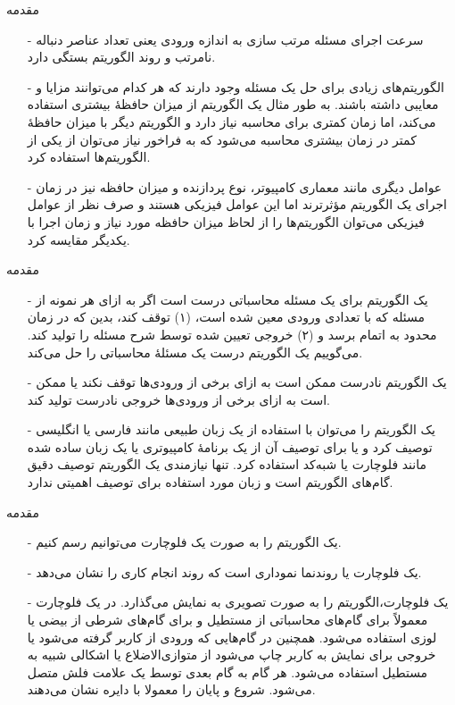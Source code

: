 \begin{frame}{مقدمه}
\begin{itemize}\itemr
\item[-]
سرعت اجرای مسئله مرتب سازی به اندازه ورودی یعنی تعداد عناصر دنباله نامرتب و روند الگوریتم بستگی دارد.
\item[-]
الگوریتم‌های زیادی برای حل یک مسئله وجود دارند که هر کدام می‌توانند مزایا و معایبی داشته باشند. به طور مثال یک الگوریتم از میزان حافظهٔ بیشتری استفاده می‌کند، اما زمان کمتری برای محاسبه نیاز دارد و الگوریتم دیگر با میزان حافظهٔ کمتر در زمان بیشتری محاسبه می‌شود که به فراخور نیاز می‌توان از یکی از الگوریتم‌ها استفاده کرد.
\item[-]
عوامل دیگری مانند معماری کامپیوتر، نوع پردازنده و میزان حافظه نیز در زمان اجرای یک الگوریتم مؤثرترند اما این عوامل فیزیکی هستند و صرف نظر از عوامل فیزیکی می‌توان الگوریتم‌ها را از لحاظ میزان حافظه مورد نیاز و زمان اجرا با یکدیگر مقایسه کرد.
\end{itemize}
\end{frame}


\begin{frame}{مقدمه}
\begin{itemize}\itemr
\item[-]
یک الگوریتم برای یک مسئله محاسباتی درست است اگر به ازای هر نمونه از مسئله که با تعدادی ورودی معین شده است، (۱) توقف کند، بدین که در زمان محدود به اتمام برسد و (۲) خروجی تعیین شده توسط شرح مسئله را تولید کند. می‌گوییم یک الگوریتم درست  یک مسئلهٔ محاسباتی را حل می‌کند.
\item[-]
یک الگوریتم نادرست ممکن است به ازای برخی از ورودی‌ها توقف نکند یا ممکن است به ازای برخی از ورودی‌ها خروجی نادرست تولید کند.
\item[-]
یک الگوریتم را می‌توان با استفاده از یک زبان طبیعی مانند فارسی یا انگلیسی توصیف کرد و یا برای توصیف آن از یک برنامهٔ کامپیوتری یا یک زبان ساده شده مانند فلوچارت یا شبه‌کد استفاده کرد. تنها نیازمندی یک الگوریتم توصیف دقیق گام‌های الگوریتم است و زبان مورد استفاده برای توصیف اهمیتی ندارد.
\end{itemize}
\end{frame}


\begin{frame}{مقدمه}
\begin{itemize}\itemr
\item[-]
یک الگوریتم را به صورت یک فلوچارت
می‌توانیم رسم کنیم.
\item[-]
یک فلوچارت یا روندنما نموداری است که روند انجام کاری را نشان می‌دهد.
\item[-]
یک فلوچارت،الگوریتم را به صورت تصویری به نمایش می‌گذارد. در یک فلوچارت معمولاً برای گام‌های محاسباتی از مستطیل و برای گام‌های شرطی از بیضی یا لوزی استفاده می‌شود. همچنین در گام‌هایی که ورودی از کاربر گرفته می‌شود یا خروجی برای نمایش به کاربر چاپ می‌شود از متوازی‌الاضلاع یا اشکالی شبیه به مستطیل استفاده می‌شود. هر گام به گام بعدی توسط یک علامت فلش متصل می‌شود. شروع و پایان را معمولا با دایره نشان می‌دهند.
\end{itemize}
\end{frame}


